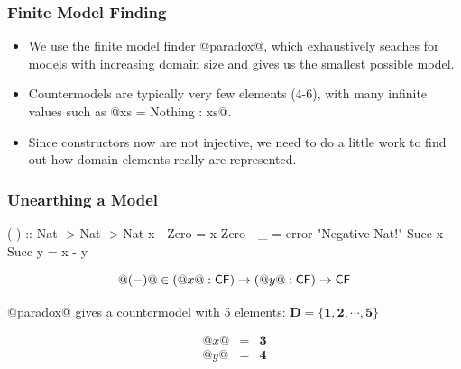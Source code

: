 \documentclass[serif,professionalfont]{beamer}
\begin{document}
\begin{frame}
  \frametitle{Finite Model Finding}

  \begin{itemize}

    \item We use the finite model finder @paradox@, which exhaustively
      seaches for models with increasing domain size and gives us the
      smallest possible model.

    \item Countermodels are typically very few elements (4-6), with many
      infinite values such as @xs = Nothing : xs@.

    \item Since constructors now are not injective, we need to do a
      little work to find out how domain elements really are
      represented.

  \end{itemize}

\end{frame}

\begin{frame}[fragile]
  \frametitle{Unearthing a Model}

    \begin{code}
        (-) :: Nat -> Nat -> Nat
        x      - Zero   = x
        Zero   - _      = error "Negative Nat!"
        Succ x - Succ y = x - y
    \end{code}
    $$@(-)@ \in (@x@ : \mathsf{CF}) \to (@y@ : \mathsf{CF}) \to \mathsf{CF} $$

    @paradox@ gives a countermodel with 5 elements:
    $\mathbf{D} = \{\mathbf{1} , \mathbf{2} , \cdots , \mathbf{5}\}$

\pause

\[\begin{array}{rcl}
@x@ & = & \mathbf{3} \\
@y@ & = & \mathbf{4}
\end{array}\]

\end{frame}
\end{document}
